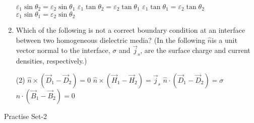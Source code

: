 \begin{enumerate}
\begin{tasks}
		\task[\textbf{A.}] $\varepsilon_{1} \sin \theta_{2}=\varepsilon_{2} \sin \theta_{1}$
		\task[\textbf{B.}] $\varepsilon_{1} \tan \theta_{2}=\varepsilon_{2} \tan \theta_{1}$
		\task[\textbf{C.}] $\varepsilon_{1} \tan \theta_{1}=\varepsilon_{2} \tan \theta_{2}$
		\task[\textbf{D.}] $\varepsilon_{1} \sin \theta_{1}=\varepsilon_{2} \sin \theta_{2}$
	\end{tasks}
	\item Which of the following is not a correct boundary condition at an interface between two homogeneous dielectric media? (In the following $\hat{n}$is a unit vector normal to the  interface, $\sigma$ and $\vec{j}_s$, are the surface charge and current densities, respectively.)
	{}
	\begin{tasks}(2)
		\task[\textbf{A.}] $\hat{n} \times\left(\vec{D}_{1}-\vec{D}_{2}\right)=0$
		\task[\textbf{B.}] $\hat{n} \times\left(\vec{H}_{1}-\vec{H}_{2}\right)=\vec{j}_{s}$
		\task[\textbf{C.}] $\hat{n} \cdot\left(\vec{D}_{1}-\vec{D}_{2}\right)=\sigma$
		\task[\textbf{D.}] $\hat{n} \cdot\left(\vec{B}_{1}-\vec{B}_{2}\right)=0$
	\end{tasks}
\end{enumerate}
\newpage
\begin{abox}
	Practise Set-2
\end{abox}

